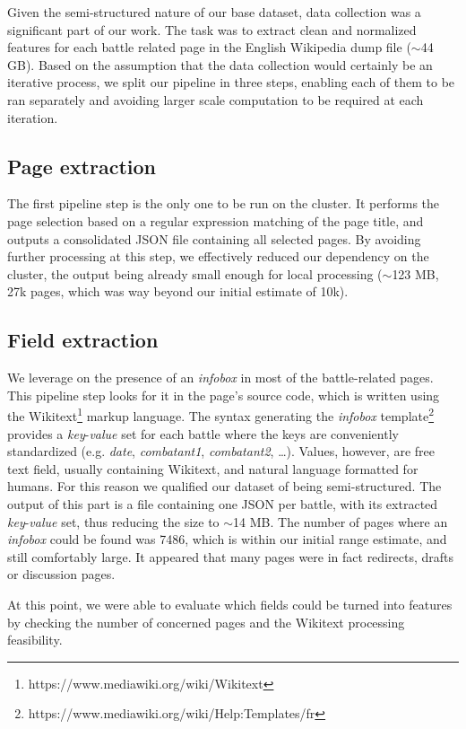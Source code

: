 Given the semi-structured nature of our base dataset, data collection was a significant part of our work. The task was to extract clean and normalized features for each battle related page in the English Wikipedia dump file ($\sim $44 GB). Based on the assumption that the data collection would certainly be an iterative process, we split our pipeline in three steps, enabling each of them to be ran separately and avoiding larger scale computation to be required at each iteration.

\subsection{Page extraction}
The first pipeline step is the only one to be run on the cluster. It performs the page selection based on a regular expression matching of the page title, and outputs a consolidated JSON file containing all selected pages. By avoiding further processing at this step, we effectively reduced our dependency on the cluster, the output being already small enough for local processing ($\sim $123 MB, 27k pages, which was way beyond our initial estimate of 10k).

\subsection{Field extraction}
We leverage on the presence of an \textit{infobox} in most of the battle-related pages. This pipeline step looks for it in the page's source code, which is written using the Wikitext\footnote{https://www.mediawiki.org/wiki/Wikitext} markup language. The syntax generating the \textit{infobox} template\footnote{https://www.mediawiki.org/wiki/Help:Templates/fr} provides a \textit{key}-\textit{value} set for each battle where the keys are conveniently standardized (e.g. \textit{date}, \textit{combatant1}, \textit{combatant2}, \dots).   Values, however, are free text field, usually containing Wikitext, and natural language formatted for humans. For this reason we qualified our dataset of being semi-structured. The output of this part is a file containing one JSON per battle, with its extracted \textit{key}-\textit{value} set, thus reducing the size to $\sim $14 MB. The number of pages where an \textit{infobox} could be found was 7486, which is within our initial range estimate, and still comfortably large. It appeared that many pages were in fact redirects, drafts or discussion pages.  

At this point, we were able to evaluate which fields could be turned into features by checking the number of concerned pages and the Wikitext processing feasibility. 

